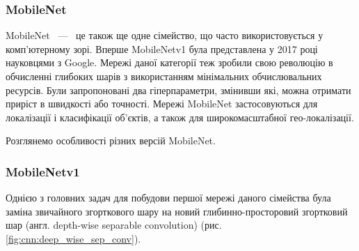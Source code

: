 \subsubsection{MobileNet}

MobileNet ~---~ це також ще одне сімейство, що часто використовується у комп'ютерному зорі.
Вперше MobileNetv1 \cite{mobilenetv1} була представлена у 2017 році науковцями з Google.
Мережі даної категорії теж зробили свою революцію в обчисленні глибоких шарів з
використанням мінімальних обчислювальних ресурсів. Були запропоновані два гіперпараметри,
змінивши які, можна отримати приріст в швидкості або точності. Мережі MobileNet
застосовуються для локалізації і класифікації об'єктів, а також для широкомасштабної
гео-локалізації.

Розглянемо особливості різних версій MobileNet.

\subsubsection{MobileNetv1}
Однією з головних задач для побудови першої мережі даного сімейства була заміна
звичайного згорткового шару на новий глибинно-просторовий згортковий шар
(англ. depth-wise separable convolution) (рис. \ref{fig:cnn:deep_wise_sep_conv}).


